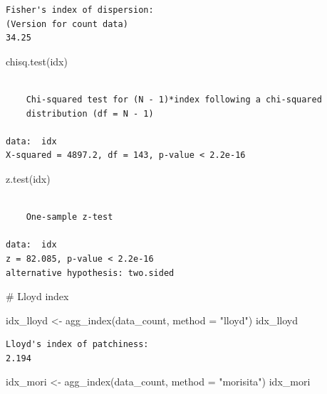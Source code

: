 \documentclass[
  letterpaper,
]{book}
\newenvironment{Shaded}{\begin{snugshade}}{\end{snugshade}}
\newcommand{\AttributeTok}[1]{\textcolor[rgb]{0.40,0.45,0.13}{#1}}
\newcommand{\CommentTok}[1]{\textcolor[rgb]{0.37,0.37,0.37}{#1}}
\newcommand{\FunctionTok}[1]{\textcolor[rgb]{0.28,0.35,0.67}{#1}}
\newcommand{\NormalTok}[1]{\textcolor[rgb]{0.00,0.23,0.31}{#1}}
\newcommand{\OtherTok}[1]{\textcolor[rgb]{0.00,0.23,0.31}{#1}}
\newcommand{\StringTok}[1]{\textcolor[rgb]{0.13,0.47,0.30}{#1}}
\begin{document}
\begin{verbatim}
Fisher's index of dispersion:
(Version for count data)
34.25
\end{verbatim}

\begin{Shaded}
\begin{Highlighting}[]
\FunctionTok{chisq.test}\NormalTok{(idx)}
\end{Highlighting}
\end{Shaded}

\begin{verbatim}

    Chi-squared test for (N - 1)*index following a chi-squared
    distribution (df = N - 1)

data:  idx
X-squared = 4897.2, df = 143, p-value < 2.2e-16
\end{verbatim}

\begin{Shaded}
\begin{Highlighting}[]
\FunctionTok{z.test}\NormalTok{(idx)}
\end{Highlighting}
\end{Shaded}

\begin{verbatim}

    One-sample z-test

data:  idx
z = 82.085, p-value < 2.2e-16
alternative hypothesis: two.sided
\end{verbatim}

\begin{Shaded}
\begin{Highlighting}[]
\CommentTok{\# Lloyd index}

\NormalTok{idx\_lloyd }\OtherTok{\textless{}{-}} \FunctionTok{agg\_index}\NormalTok{(data\_count, }\AttributeTok{method =} \StringTok{"lloyd"}\NormalTok{)}
\NormalTok{idx\_lloyd}
\end{Highlighting}
\end{Shaded}

\begin{verbatim}
Lloyd's index of patchiness:
2.194
\end{verbatim}

\begin{Shaded}
\begin{Highlighting}[]
\NormalTok{idx\_mori }\OtherTok{\textless{}{-}} \FunctionTok{agg\_index}\NormalTok{(data\_count, }\AttributeTok{method =} \StringTok{"morisita"}\NormalTok{)}
\NormalTok{idx\_mori}
\end{Highlighting}
\end{Shaded}
\end{document}
